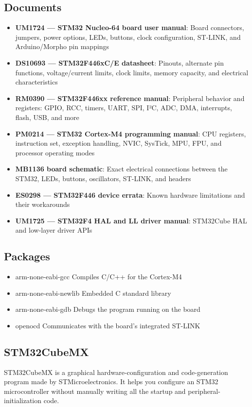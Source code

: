\documentclass{report}
\begin{document}
    \subsection{Documents}
    \begin{itemize}
        \item \textbf{UM1724 — STM32 Nucleo-64 board user manual}:	Board connectors, jumpers, power options, LEDs, buttons, clock configuration, ST-LINK, and Arduino/Morpho pin mappings
        \item \textbf{DS10693 — STM32F446xC/E datasheet}:	Pinouts, alternate pin functions, voltage/current limits, clock limits, memory capacity, and electrical characteristics
        \item \textbf{RM0390 — STM32F446xx reference manual}:	Peripheral behavior and registers: GPIO, RCC, timers, UART, SPI, I²C, ADC, DMA, interrupts, flash, USB, and more
        \item \textbf{PM0214 — STM32 Cortex-M4 programming manual}:	CPU registers, instruction set, exception handling, NVIC, SysTick, MPU, FPU, and processor operating modes
        \item \textbf{MB1136 board schematic}:	Exact electrical connections between the STM32, LEDs, buttons, oscillators, ST-LINK, and headers
        \item \textbf{ES0298 — STM32F446 device errata}:	Known hardware limitations and their workarounds
        \item \textbf{UM1725 — STM32F4 HAL and LL driver manual}:	STM32Cube HAL and low-layer driver APIs
    \end{itemize}

    \bigbreak \noindent 
    \subsection{Packages}
    \begin{itemize}
        \item arm-none-eabi-gcc	Compiles C/C++ for the Cortex-M4
        \item arm-none-eabi-newlib	Embedded C standard library
        \item arm-none-eabi-gdb	Debugs the program running on the board
        \item openocd	Communicates with the board’s integrated ST-LINK
    \end{itemize}

    \bigbreak \noindent 
    \subsection{STM32CubeMX}
    \bigbreak \noindent 
    STM32CubeMX is a graphical hardware-configuration and code-generation program made by STMicroelectronics. It helps you configure an STM32 microcontroller without manually writing all the startup and peripheral-initialization code.
\end{document}
